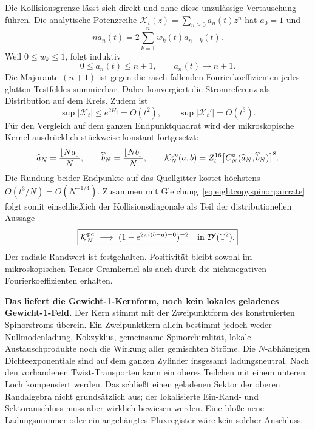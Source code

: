 Die Kollisionsgrenze lässt sich direkt und ohne diese unzulässige Vertauschung führen. Die analytische Potenzreihe $\mathcal K_t(z)=\sum_{n\ge0}a_n(t)z^n$ hat $a_0=1$ und
\[
 n a_n(t)=2\sum_{k=1}^n w_k(t)a_{n-k}(t).
\]
Weil $0\le w_k\le1$, folgt induktiv
\[
 0\le a_n(t)\le n+1,\qquad a_n(t)\longrightarrow n+1.
\]
Die Majorante $(n+1)$ ist gegen die rasch fallenden Fourierkoeffizienten jedes glatten Testfeldes summierbar. Daher konvergiert die Stromreferenz als Distribution auf dem Kreis. Zudem ist
\[
 \sup|\mathcal K_t|\le e^{2H_t}=O(t^2),\qquad
 \sup|\mathcal K_t'|=O(t^3).
\]
Für den Vergleich auf dem ganzen Endpunktquadrat wird der mikroskopische Kernel ausdrücklich stückweise konstant fortgesetzt:
\[
 \widehat a_N=\frac{\lfloor Na\rfloor}{N},\qquad
 \widehat b_N=\frac{\lfloor Nb\rfloor}{N},\qquad
 \mathcal K_N^{\rm pc}(a,b)
 =Z_t^{16}\bigl[C_N^\circ(\widehat a_N,\widehat b_N)\bigr]^8.
\]
Die Rundung beider Endpunkte auf das Quellgitter kostet höchstens $O(t^3/N)=O(N^{-1/4})$. Zusammen mit Gleichung~\eqref{eq:eightcopyspinorpairrate} folgt somit einschließlich der Kollisionsdiagonale als Teil der distributionellen Aussage
\begin{equation}\label{eq:microscopicweightonepair}
 \boxed{\mathcal K_N^{\rm pc}
 \ \longrightarrow\
 (1-e^{2\pi i(b-a)-0})^{-2}
 \quad\text{in }\mathcal D'(\mathbb T^2).}
\end{equation}
Der radiale Randwert ist festgehalten. Positivität bleibt sowohl im mikroskopischen Tensor-Gramkernel als auch durch die nichtnegativen Fourierkoeffizienten erhalten.

\textbf{Das liefert die Gewicht-1-Kernform, noch kein lokales geladenes Gewicht-1-Feld.} Der Kern stimmt mit der Zweipunktform des konstruierten Spinorstroms überein. Ein Zweipunktkern allein bestimmt jedoch weder Nullmodenladung, Kokzyklus, gemeinsame Spinorchiralität, lokale Austauschprodukte noch die Wirkung aller gemischten Ströme. Die $N$-abhängigen Dichteexponentiale sind auf dem ganzen Zylinder insgesamt ladungsneutral. Nach den vorhandenen Twist-Transporten kann ein oberes Teilchen mit einem unteren Loch kompensiert werden. Das schließt einen geladenen Sektor der oberen Randalgebra nicht grundsätzlich aus; der lokalisierte Ein-Rand- und Sektoranschluss muss aber wirklich bewiesen werden. Eine bloße neue Ladungsnummer oder ein angehängtes Fluxregister wäre kein solcher Anschluss.


